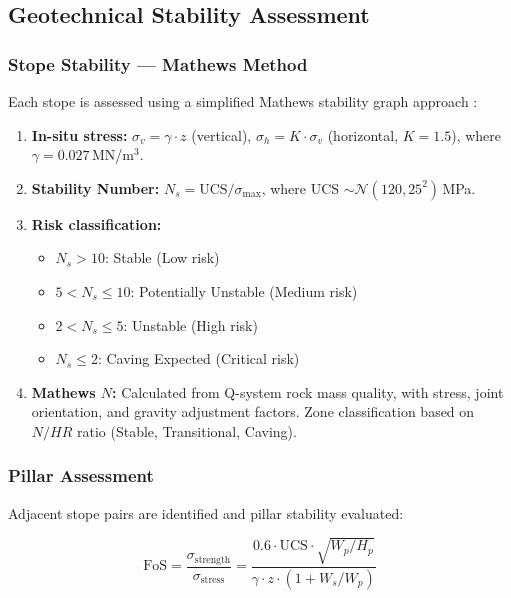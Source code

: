 \documentclass[12pt,a4paper]{article}
\begin{document}
\subsection{Geotechnical Stability Assessment}
\label{sec:geotech}

\subsubsection{Stope Stability --- Mathews Method}

Each stope is assessed using a simplified Mathews stability graph approach \cite{mathews1981,potvin1988}:

\begin{enumerate}
    \item \textbf{In-situ stress:} $\sigma_v = \gamma \cdot z$ (vertical), $\sigma_h = K \cdot \sigma_v$ (horizontal, $K = 1.5$), where $\gamma = 0.027$\,MN/m$^3$.
    \item \textbf{Stability Number:} $N_s = \text{UCS} / \sigma_{\max}$, where UCS $\sim \mathcal{N}(120, 25^2)$\,MPa.
    \item \textbf{Risk classification:}
    \begin{itemize}
        \item $N_s > 10$: Stable (Low risk)
        \item $5 < N_s \leq 10$: Potentially Unstable (Medium risk)
        \item $2 < N_s \leq 5$: Unstable (High risk)
        \item $N_s \leq 2$: Caving Expected (Critical risk)
    \end{itemize}
    \item \textbf{Mathews $N$:} Calculated from Q-system rock mass quality, with stress, joint orientation, and gravity adjustment factors. Zone classification based on $N / HR$ ratio (Stable, Transitional, Caving).
\end{enumerate}

\subsubsection{Pillar Assessment}

Adjacent stope pairs are identified and pillar stability evaluated:

\begin{equation}
    \text{FoS} = \frac{\sigma_{\text{strength}}}{\sigma_{\text{stress}}} = \frac{0.6 \cdot \text{UCS} \cdot \sqrt{W_p / H_p}}{\gamma \cdot z \cdot (1 + W_s / W_p)}
\end{equation}
\end{document}
